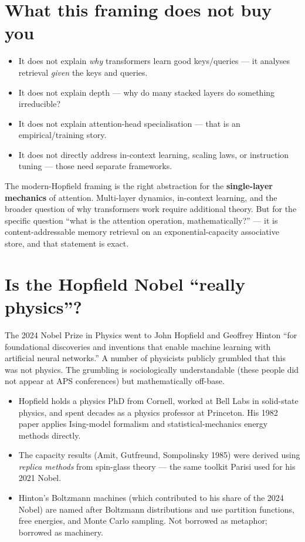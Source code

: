 \documentclass[11pt,a4paper]{article}
\begin{document}
\section{What this framing does not buy you}

\begin{itemize}
\item It does not explain \emph{why} transformers learn good
    keys/queries --- it analyses retrieval \emph{given} the keys and
    queries.
\item It does not explain depth --- why do many stacked layers do
    something irreducible?
\item It does not explain attention-head specialisation --- that is an
    empirical/training story.
\item It does not directly address in-context learning, scaling laws,
    or instruction tuning --- those need separate frameworks.
\end{itemize}

The modern-Hopfield framing is the right abstraction for the
\textbf{single-layer mechanics} of attention. Multi-layer dynamics,
in-context learning, and the broader question of why transformers work
require additional theory. But for the specific question ``what is the
attention operation, mathematically?'' --- it is content-addressable
memory retrieval on an exponential-capacity associative store, and that
statement is exact.

\section{Is the Hopfield Nobel ``really physics''?}

The 2024 Nobel Prize in Physics went to John Hopfield and Geoffrey
Hinton ``for foundational discoveries and inventions that enable machine
learning with artificial neural networks.'' A number of physicists
publicly grumbled that this was not physics. The grumbling is
sociologically understandable (these people did not appear at APS
conferences) but mathematically off-base.

\begin{itemize}
\item Hopfield holds a physics PhD from Cornell, worked at Bell Labs in
    solid-state physics, and spent decades as a physics professor at
    Princeton. His 1982 paper applies Ising-model formalism and
    statistical-mechanics energy methods directly.
\item The capacity results (Amit, Gutfreund, Sompolinsky 1985) were
    derived using \emph{replica methods} from spin-glass theory --- the
    same toolkit Parisi used for his 2021 Nobel.
\item Hinton's Boltzmann machines (which contributed to his share of
    the 2024 Nobel) are named after Boltzmann distributions and use
    partition functions, free energies, and Monte Carlo sampling. Not
    borrowed as metaphor; borrowed as machinery.
\end{itemize}
\end{document}
